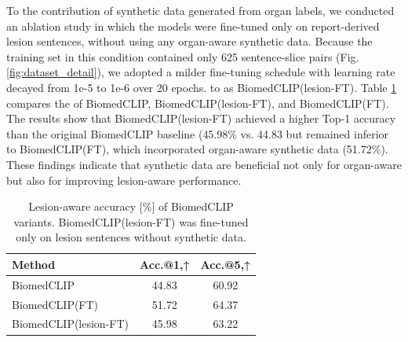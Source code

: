 \documentclass[bioengineering,article,submit,pdftex,moreauthors]{Definitions/mdpi}
\begin{document}
  To  the contribution of synthetic data generated from organ labels, we conducted an ablation study in which the models were fine-tuned only on report-derived lesion sentences, without using any organ-aware synthetic data. 
  Because the training set in this condition contained only 625 sentence-slice pairs (Fig. \ref{fig:dataset_detail}), we adopted a milder fine-tuning schedule with  learning rate decayed from 1e-5 to 1e-6 over 20 epochs. 
    to as BiomedCLIP(lesion-FT). 
  Table \ref{tab:impact} compares the   of BiomedCLIP, BiomedCLIP(lesion-FT), and BiomedCLIP(FT).
  The results show that BiomedCLIP(lesion-FT) achieved a higher Top-1 accuracy than the original BiomedCLIP baseline (45.98\% vs. 44.83\replaced{\%),}{\%)} but remained inferior to BiomedCLIP(FT), which incorporated organ-aware synthetic data (51.72\%).
  These findings indicate that synthetic data are beneficial not only for organ-aware  but also for improving lesion-aware performance.


\begin{table}[ht]
  \centering
  \caption{ Lesion-aware accuracy [\%] of BiomedCLIP variants. BiomedCLIP(lesion-FT) was fine-tuned only on lesion sentences without synthetic data.}
  \label{tab:impact}
  \begin{tabular}{lcc}
    \toprule
    Method                  & Acc.@1,↑      & Acc.@5,↑       \\
    \midrule
    BiomedCLIP              & 44.83       & 60.92        \\
    BiomedCLIP(FT)          & 51.72       & 64.37        \\
    BiomedCLIP(lesion-FT)   & 45.98       & 63.22        \\
    \bottomrule
  \end{tabular}
\end{table}
\end{document}
